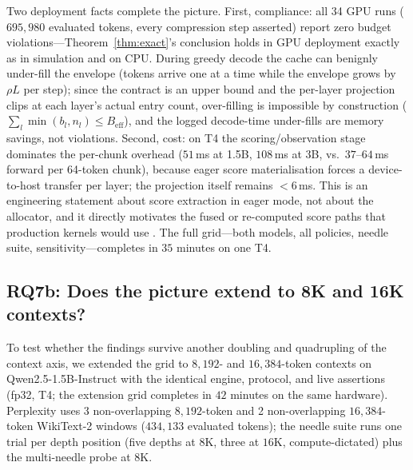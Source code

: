 Two deployment facts complete the picture. First, compliance: all 34
GPU runs ($695{,}980$ evaluated tokens, every compression step
asserted) report zero budget violations---Theorem~\ref{thm:exact}'s
conclusion holds in GPU deployment exactly as in simulation and on CPU.
During greedy decode the cache can benignly under-fill the envelope
(tokens arrive one at a time while the envelope grows by $\rho L$ per
step); since the contract is an upper bound and the per-layer projection
clips at each layer's actual entry count, over-filling is impossible by
construction ($\sum_l \min(b_l, n_l) \le B_{\mathrm{eff}}$), and the
logged decode-time under-fills are memory savings, not violations.
Second, cost: on T4 the scoring/observation stage dominates the
per-chunk overhead ($51$\,ms at 1.5B, $108$\,ms at 3B, vs.\ $37$--$64$\,ms
forward per 64-token chunk), because eager score materialisation forces
a device-to-host transfer per layer; the projection itself remains
$<6$\,ms. This is an engineering statement about score extraction in
eager mode, not about the allocator, and it directly motivates the
fused or re-computed score paths that production kernels would use
\cite{mao2026infra}. The full grid---both models, all policies, needle
suite, sensitivity---completes in $35$ minutes on one T4.

\subsection{RQ7b: Does the picture extend to 8K and 16K contexts?}
\label{sec:exp-ext8k}

To test whether the findings survive another doubling and quadrupling
of the context axis, we extended the grid to $8{,}192$- and
$16{,}384$-token contexts on Qwen2.5-1.5B-Instruct with the identical
engine, protocol, and live assertions (fp32, T4; the extension grid
completes in $42$ minutes on the same hardware). Perplexity uses 3
non-overlapping $8{,}192$-token and 2 non-overlapping $16{,}384$-token
WikiText-2 windows ($434{,}133$ evaluated tokens); the needle suite
runs one trial per depth position (five depths at $8$K, three at
$16$K, compute-dictated) plus the multi-needle probe at $8$K.


